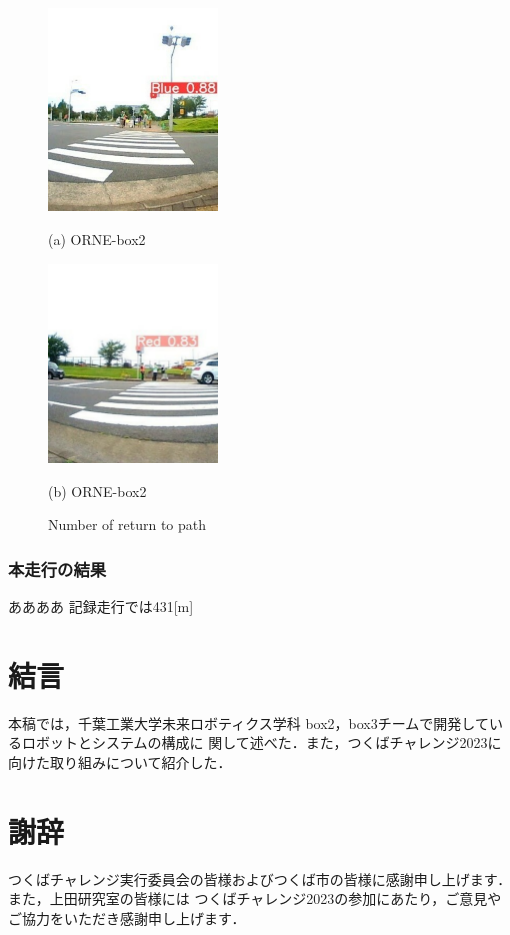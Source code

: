 \documentclass[twocolumn, 9pt]{jsproceedings}
\begin{document}
\begin{figure}[h!]
  \begin{minipage}[t]{0.47\linewidth}
    \centering
    \includegraphics[width=45mm]{fig/blue_cut.pdf}
    \caption*{(a) ORNE-box2}
  \end{minipage}
  \hspace*{2mm}
  \begin{minipage}[t]{0.47\linewidth}
    \centering
    \includegraphics[width=45mm]{fig/red_cut.pdf}
    \caption*{(b) ORNE-box2}
  \end{minipage}%
  \caption{Number of return to path}
\end{figure}

\subsubsection{本走行の結果}
ああああ
記録走行では431[m]



\section{結言}
本稿では，千葉工業大学未来ロボティクス学科 box2，box3チームで開発しているロボットとシステムの構成に
関して述べた．また，つくばチャレンジ2023に向けた取り組みについて紹介した．\\

\section*{謝辞}
つくばチャレンジ実行委員会の皆様およびつくば市の皆様に感謝申し上げます．また，上田研究室の皆様には
つくばチャレンジ2023の参加にあたり，ご意見やご協力をいただき感謝申し上げます．\\
\end{document}
